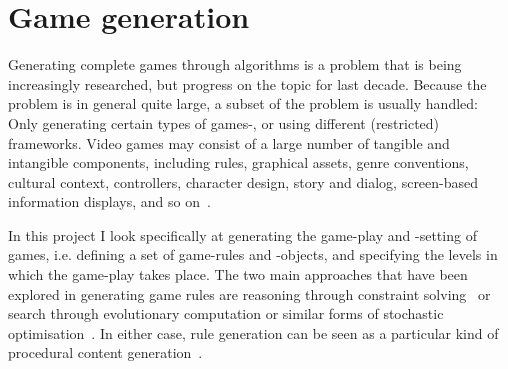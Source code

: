 \documentclass[a4paper,titlepage,final]{report}
\begin{document}
%
%
%
%




\section{Game generation}
\label{sec_gamegen}
Generating complete games through algorithms is a problem that is being increasingly researched, but progress on the topic for last decade. Because the problem is in general quite large, a subset of the problem is usually handled: Only generating certain types of games-, or using different (restricted) frameworks. 
Video games may consist of a large number of tangible and intangible components, including rules, graphical assets, genre conventions, cultural context, controllers, character design, story and dialog, screen-based information displays, and so on~\citet{cook2014angelina,liapis2014creativity,nelson2007automated}.

In this project I look specifically at generating the game-play and -setting of games, i.e. defining a set of game-rules and -objects, and specifying the levels in which the game-play takes place.
The two main approaches that have been explored in generating game rules are reasoning through constraint solving~\citet{smith2010variations} or search through evolutionary computation or similar forms of stochastic optimisation~\citet{togelius2008experiment,browne2008automated,font2013towards}. 
In either case, rule generation can be seen as a particular kind of procedural content generation~\citet{pcgbook:ch6}.
\end{document}

